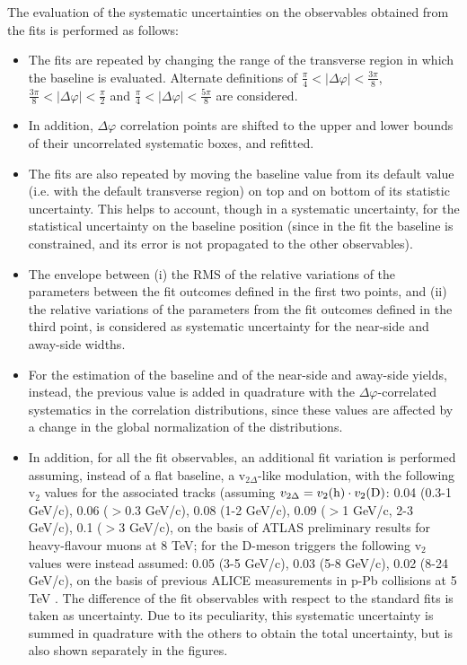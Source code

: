 The evaluation of the systematic uncertainties on the observables obtained from the fits is performed as follows:

\begin{itemize}
\item The fits are repeated by changing the range of the transverse region in which the baseline is evaluated. Alternate definitions of $\frac{\pi}{4}<|\Delta\varphi|<\frac{3\pi}{8}$, $\frac{3\pi}{8}<|\Delta\varphi|<\frac{\pi}{2}$ and $\frac{\pi}{4}<|\Delta\varphi|<\frac{5\pi}{8}$ are considered.
\item In addition, $\Delta\varphi$ correlation points are shifted to the upper and lower bounds of their uncorrelated systematic boxes, and refitted.
\item The fits are also repeated by moving the baseline value from its default value (i.e. with the default transverse region) on top and on bottom of its statistic uncertainty. This helps to account, though in a systematic uncertainty, for the statistical uncertainty on the baseline position (since in the fit the baseline is constrained, and its error is not propagated to the other observables).
\item The envelope between (i) the RMS of the relative variations of the parameters between the fit outcomes defined in the first two points, and (ii) the relative variations of the parameters from the fit outcomes defined in the third point, is considered as systematic uncertainty for the near-side and away-side widths.
\item For the estimation of the baseline and of the near-side and away-side yields, instead, the previous value is added in quadrature with the $\Delta\varphi$-correlated systematics in the correlation distributions, since these values are affected by a change in the global normalization of the distributions.
\item In addition, for all the fit observables, an additional fit variation is performed assuming, instead of a flat baseline, a v$_{2\Delta}$-like modulation, with the following v$_2$ values for the associated tracks (assuming $v_{2\Delta} = v_2({\rm h}) \cdot v_2({\rm D})$: 0.04 (0.3-1 GeV/c), 0.06 ($>$0.3 GeV/c), 0.08 (1-2 GeV/c), 0.09 ($>$1 GeV/c, 2-3 GeV/c), 0.1 ($>$3 GeV/c), on the basis of ATLAS preliminary results for heavy-flavour muons at 8 TeV; for the D-meson triggers the following v$_2$ values were instead assumed: 0.05 (3-5 GeV/c), 0.03 (5-8 GeV/c), 0.02 (8-24 GeV/c), on the basis of previous ALICE measurements in p-Pb collisions at 5 TeV \cite{ALICEv2ppb}. The difference of the fit observables with respect to the standard fits is taken as uncertainty. Due to its peculiarity, this systematic uncertainty is summed in quadrature with the others to obtain the total uncertainty, but is also shown separately in the figures.
\end{itemize}

